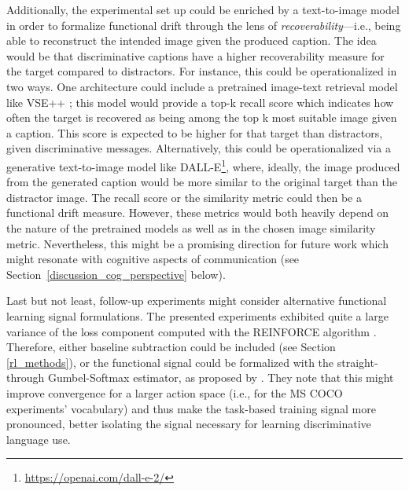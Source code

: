 Additionally, the experimental set up could be enriched by a text-to-image model in order to formalize functional drift through the lens of \emph{recoverability}---i.e., being able to reconstruct the intended image given the produced caption. The idea would be that discriminative captions have a higher recoverability measure for the target compared to distractors. For instance, this could be operationalized in two ways. One architecture could include a pretrained image-text retrieval model like VSE++ \parencite{faghri2017vse++}; this model would provide a top-k recall score which indicates how often the target is recovered as being among the top k most suitable image given a caption. This score is expected to be higher for that target than distractors, given discriminative messages. Alternatively, this could be operationalized via a generative text-to-image model like DALL-E\footnote{\url{https://openai.com/dall-e-2/}}, where, ideally, the image produced from the generated caption would be more similar to the original target than the distractor image. The recall score or the similarity metric could then be a functional drift measure. However, these metrics would both heavily depend on the nature of the pretrained models as well as in the chosen image similarity metric. Nevertheless, this might be a promising direction for future work which might resonate with cognitive aspects of communication (see Section~\ref{discussion_cog_perspective} below). 

Last but not least, follow-up experiments might consider alternative functional learning signal formulations. The presented experiments exhibited quite a large variance of the loss component computed with the REINFORCE algorithm . Therefore, either baseline subtraction could be included (see Section \ref{rl_methods}), or the functional signal could be formalized with the straight-through Gumbel-Softmax estimator, as proposed by \cite{havrylov2017emergence}. They note that this might improve convergence for a larger action space (i.e., for the MS COCO experiments' vocabulary) and thus make the task-based training signal more pronounced, better isolating the signal necessary for learning discriminative language use.


